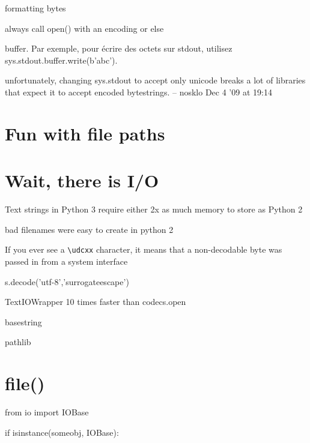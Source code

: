 formatting bytes

always call open() with an encoding or else

buffer. Par exemple, pour écrire des octets sur stdout, utilisez sys.stdout.buffer.write(b'abc').

unfortunately, changing sys.stdout to accept only unicode breaks a lot of libraries that expect it to accept encoded bytestrings. – nosklo Dec 4 '09 at 19:14


\section{Fun with file paths}

\section{Wait, there is I/O}


Text strings in Python 3 require either 2x as much memory to store as Python 2


bad filenames were easy to create in python 2

If you ever see a \lstinline{\udcxx} character, it means that a non-decodable byte was passed in from a system interface

s.decode('utf-8','surrogateescape')

TextIOWrapper 10 times faster than codecs.open

basestring



pathlib


\section{file()}

\begin{py2}
from io import IOBase

if isinstance(someobj, IOBase):
\end{py2}

